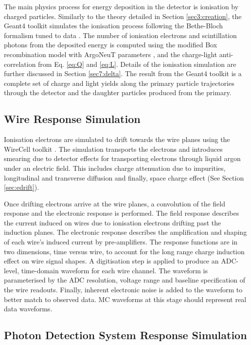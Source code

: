The main physics process for energy deposition in the detector is ionisation by charged particles.
Similarly to the theory detailed in Section \ref{sec3:creation}, the Geant4 toolkit simulates the ionisation process following the Bethe-Bloch formalism tuned to data \cite{geant4_ions}.
The number of ionisation electrons and scintillation photons from the deposited energy is computed using the modified Box recombination model with ArgoNeuT parameters \cite{argoneut_recomb}, and the charge-light anti-correlation from Eq. \ref{eq:Q} and \ref{eq:L}. 
Details of the ionisation simulation are further discussed in Section \ref{sec7:delta}.
The result from the Geant4 toolkit is a complete set of charge and light yields along the primary particle trajectories through the detector and the daughter particles produced from the primary.

\subsection{Wire Response Simulation}
\label{sec:wire_response}

Ionisation electrons are simulated to drift towards the wire planes using the WireCell toolkit \cite{wirecell}.
The simulation transports the electrons and introduces smearing due to detector effects for transporting electrons through liquid argon under an electric field.
This includes charge attenuation due to impurities, longitudinal and transverse diffusion and finally, space charge effect (See Section \ref{sec:edrift}).

Once drifting electrons arrive at the wire planes, a convolution of the field response and the electronic response is performed.
The field response describes the current induced on wires due to ionisation electrons drifting past the induction planes.
The electronic response describes the amplification and shaping of each wire's induced current by pre-amplifiers.
The response functions are in two dimensions, time versus wire, to account for the long range charge induction effect on wire signal shapes.
A digitisation step is applied to produce an ADC-level, time-domain waveform for each wire channel.
The waveform is parameterised by the ADC resolution, voltage range and baseline specification of the wire readouts.
Finally, inherent electronic noise is added to the waveform to better match to observed data.
MC waveforms at this stage should represent real data waveforms.

\subsection{Photon Detection System Response Simulation}
\label{sec:pds_response}


